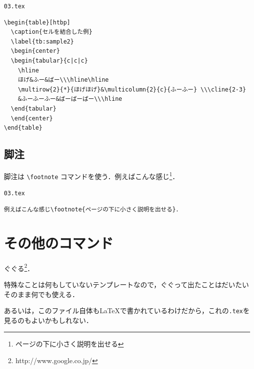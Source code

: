 \begin{itembox}[l]{{\tt 03.tex}}
\begin{verbatim}
\begin{table}[htbp]
  \caption{セルを結合した例}
  \label{tb:sample2}
  \begin{center}
  \begin{tabular}{c|c|c}
    \hline
    ほげ&ふー&ばー\\\hline\hline
    \multirow{2}{*}{ほげほげ}&\multicolumn{2}{c}{ふーふー} \\\cline{2-3}
    &ふーふーふー&ばーばーばー\\\hline
  \end{tabular}
  \end{center}
\end{table}
\end{verbatim}
\end{itembox}


\subsection{脚注}

脚注は \verb|\footnote| コマンドを使う．例えばこんな感じ\footnote{ページの下に小さく説明を出せる}．

\begin{itembox}[l]{{\tt 03.tex}}
\begin{verbatim}
例えばこんな感じ\footnote{ページの下に小さく説明を出せる}．
\end{verbatim}
\end{itembox}

\section{その他のコマンド}

ぐぐる\footnote{http://www.google.co.jp/}．

特殊なことは何もしていないテンプレートなので，ぐぐって出たことはだいたいそのまま何でも使える．

あるいは，このファイル自体も\LaTeX で書かれているわけだから，これの{\tt *.tex}を見るのもよいかもしれない．
